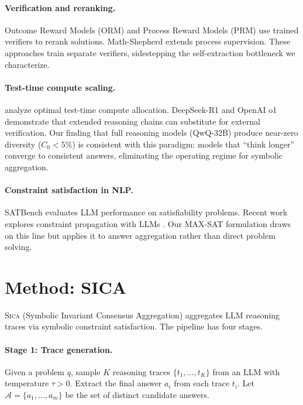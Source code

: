 \documentclass[11pt,a4paper]{article}
\newcommand{\sica}{\textsc{Sica}}
\begin{document}
\paragraph{Verification and reranking.}
Outcome Reward Models (ORM) \citep{cobbe2021gsm8k} and Process Reward Models (PRM) \citep{lightman2023prm} use trained verifiers to rerank solutions.
Math-Shepherd \citep{wang2024mathshepherd} extends process supervision.
These approaches train separate verifiers, sidestepping the self-extraction bottleneck we characterize.

\paragraph{Test-time compute scaling.}
\citet{snell2025scaling} analyze optimal test-time compute allocation.
DeepSeek-R1 \citep{deepseekr1} and OpenAI o1 \citep{openai2024o1} demonstrate that extended reasoning chains can substitute for external verification.
Our finding that full reasoning models (QwQ-32B) produce near-zero diversity ($C_0{<}5\%$) is consistent with this paradigm: models that ``think longer'' converge to consistent answers, eliminating the operating regime for symbolic aggregation.

\paragraph{Constraint satisfaction in NLP.}
SATBench \citep{satbench2025} evaluates LLM performance on satisfiability problems.
Recent work explores constraint propagation with LLMs \citep{llmcp2025}.
Our MAX-SAT formulation draws on this line but applies it to answer aggregation rather than direct problem solving.

\section{Method: SICA}
\label{sec:method}

\sica{} (Symbolic Invariant Consensus Aggregation) aggregates LLM reasoning traces via symbolic constraint satisfaction.
The pipeline has four stages.

\paragraph{Stage 1: Trace generation.}
Given a problem $q$, sample $K$ reasoning traces $\{t_1, \ldots, t_K\}$ from an LLM with temperature $\tau > 0$.
Extract the final answer $a_i$ from each trace $t_i$.
Let $\mathcal{A} = \{a_1, \ldots, a_m\}$ be the set of distinct candidate answers.
\end{document}
